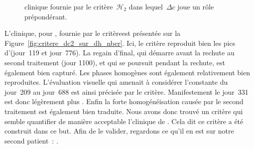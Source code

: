 \documentclass[main.tex]{subfiles}
\begin{document}
%

\begin{figure}[t]
\centering
{}
\caption{\label{fig:critere_dc2_sur_dh}\Hetero clinique fournie par le critère~$\mathcal{H}_{2}$ dans lequel~$\Delta c$ joue un rôle prépondérant.}
\end{figure}


L'\hetero clinique, pour \Nber, fournie par le critère\HH est présentée sur la Figure~\ref{fig:critere_dc2_sur_dh_nber}. Ici, le critère reproduit bien les pics d'\heteros (jour~119 et jour~776). La regain d'\hetero final, qui démarre avant la rechute au second traitement (jour 1100), et qui se poursuit pendant la rechute, est également bien capturé. Les phases homogènes sont également relativement bien reproduites. L'évaluation visuelle qui amenait à considérer l'\hetero constante du jour~209 au jour~688 est ainsi précisée par le critère. Manifestement le jour~331 est donc légèrement plus \heterogene. 
Enfin la forte homogénéisation causée par le second traitement est également bien traduite. 
Nous avons donc trouvé un critère qui semble quantifier de manière acceptable l'\hetero clinique de \Nber. Cela dit ce critère a été construit dans ce but. Afin de le valider, regardons ce qu'il en est sur notre second patient~: \Chen.
\end{document}
